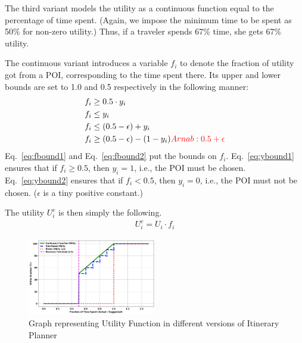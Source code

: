 The third variant models the utility as a continuous function equal to the
percentage of time spent.  (Again, we impose the minimum time to be spent
as 50\% for non-zero utility.) Thus, if a traveler spends 67\% time, she
gets 67\% utility.

The continuous variant introduces a variable $f_i$ to denote the fraction of utility got from a POI, corresponding to the time spent there.
Its upper and lower bounds are set to 1.0 and 0.5 respectively in the following manner:
%
\begin{align}
	\label{eq:fbound1}
	f_i & \geq 0.5 \cdot y_i \\
	\label{eq:fbound2}
	f_i & \leq y_i \\
	\label{eq:ybound1}
	f_i & \leq (0.5 - \epsilon) + y_i \\
	\label{eq:ybound2}
	f_i & \geq (0.5 - \epsilon) - (1 - y_i) \ab{0.5 + \epsilon}
\end{align}
%
Eq.~\eqref{eq:fbound1} and Eq.~\eqref{eq:fbound2} put the bounds on $f_i$.
Eq.~\eqref{eq:ybound1} ensures that if $f_i \geq 0.5$, then $y_i = 1$,  i.e., the POI must be chosen.  Eq.~\eqref{eq:ybound2} ensures that if $f_i
< 0.5$, then $y_i = 0$,  i.e., the POI must not be chosen.  ($\epsilon$ is a
tiny positive constant.)

The utility $U^c_i$ is then simply the following.
%
\begin{align}
	\label{eq:continuous}
	U^c_i = U_i \cdot f_i
\end{align}

\begin{figure}[H]
\centering
\includegraphics[width=0.5\textwidth]{plots/UF_Combined.png}
\caption{Graph representing Utility Function in different versions of Itinerary Planner}
\label{fig:UF_Combined}
\end{figure}

